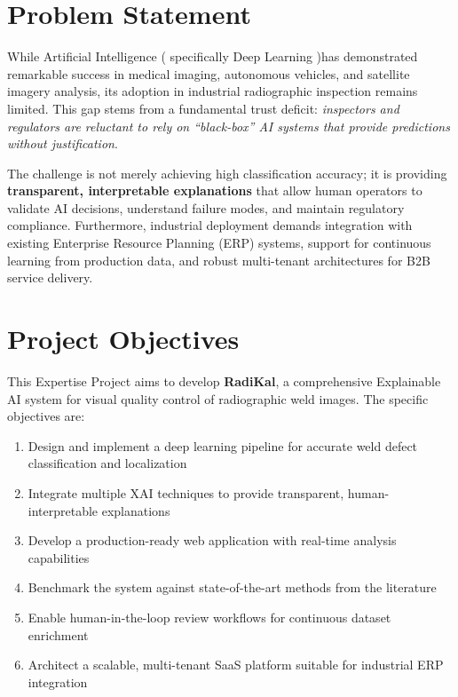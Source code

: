 \documentclass[12pt,a4paper]{report}
\begin{document}
\section*{Problem Statement}

While Artificial Intelligence ( specifically Deep Learning )has demonstrated remarkable success in medical imaging, autonomous vehicles, and satellite imagery analysis, its adoption in industrial radiographic inspection remains limited. This gap stems from a fundamental trust deficit: \textit{inspectors and regulators are reluctant to rely on ``black-box'' AI systems that provide predictions without justification}.

The challenge is not merely achieving high classification accuracy; it is providing \textbf{transparent, interpretable explanations} that allow human operators to validate AI decisions, understand failure modes, and maintain regulatory compliance. Furthermore, industrial deployment demands integration with existing Enterprise Resource Planning (ERP) systems, support for continuous learning from production data, and robust multi-tenant architectures for B2B service delivery.

\section*{Project Objectives}

This Expertise Project aims to develop \textbf{RadiKal}, a comprehensive Explainable AI system for visual quality control of radiographic weld images. The specific objectives are:

\begin{enumerate}
    \item Design and implement a deep learning pipeline for accurate weld defect classification and localization
    \item Integrate multiple XAI techniques to provide transparent, human-interpretable explanations
    \item Develop a production-ready web application with real-time analysis capabilities
    \item Benchmark the system against state-of-the-art methods from the literature
    \item Enable human-in-the-loop review workflows for continuous dataset enrichment
    \item Architect a scalable, multi-tenant SaaS platform suitable for industrial ERP integration
\end{enumerate}
\end{document}
